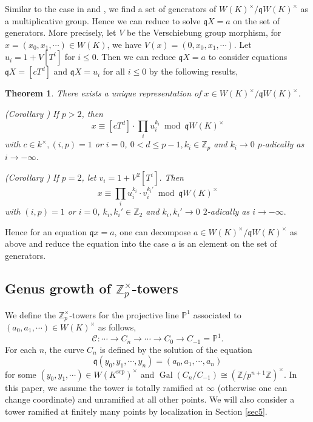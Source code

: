 \documentclass{proc-l}
\newtheorem{theorem}{Theorem}[section]
\theoremstyle{definition}
\theoremstyle{remark}
\numberwithin{equation}{section}
\DeclareMathOperator{\Gal}{Gal}
\DeclareMathOperator{\sep}{sep}
\begin{document}
{Similar to the case in \cite{MR3754335} and \cite{MR1697859}, we find a set of generators of $W(K)^\times/\mathfrak qW(K)^\times$ as a multiplicative group. Hence we can reduce to solve $\mathfrak qX=a$ on the set of generators. More precisely, let $V$ be the Verschiebung group morphism, for $x=(x_0,x_1,\cdots)\in W(K)$, we have $V(x)=(0,x_0,x_1,\cdots)$. Let $u_i=1+V[T^i]$ for $i\leq0$. Then we can reduce $\mathfrak qX=a$ to consider equations $\mathfrak qX=[cT^d]$ and $\mathfrak qX=u_i$ for all $i\leq0$ by the following results,
\begin{theorem}{\label {13}}
     There exists a unique representation of $x\in W(K)^\times/\mathfrak qW(K)^\times$. 
     
(Corollary \boxed{\ref{3.8}}) If $p>2$, then
$$x\equiv [cT^d]\cdot\prod_{i}u_i^{k_i}\bmod\mathfrak qW(K)^\times$$
with $c\in k^\times, (i,p)=1$ or $i=0$, $0< d\leq p-1,k_i\in\mathbb Z_p$ and $k_i\rightarrow 0$ $p$-adically as $i\rightarrow-\infty$.

(Corollary \boxed{\ref{3.7}}) If $p=2$, let $v_i=1+V^2[T^i]$. Then 
$$x\equiv\prod_{i}u_i^{k_i}\cdot v_i^{k_i'}\bmod\mathfrak qW(K)^\times$$
with $(i,p)=1$ or $i=0$, $k_i,k_i'\in\mathbb Z_2$ and $k_i,k_i'\rightarrow0$ $2$-adically as $i\rightarrow-\infty.$
\end{theorem} 

Hence for an equation $\mathfrak qx=a$, one can decompose $a\in W(K)^\times/\mathfrak qW(K)^\times$ as above and reduce the equation into the case $a$ is an element on the set of generators.


\subsection{Genus growth of $\mathbb Z_p^\times$-towers}
We define the $\mathbb Z_p^\times$-towers for the projective line $\mathbb P^1$ associated to $(a_0,a_1,\cdots)\in W(K)^\times$ as follows,
$$\mathscr C:\cdots\rightarrow C_n\rightarrow\cdots\rightarrow C_0\rightarrow C_{-1}=\mathbb P^1.$$
For each $n$, the curve $C_n$ is defined by the solution of the equation $$\mathfrak q(y_0,y_1,\cdots,y_{n})=(a_0,a_1,\cdots,a_{n})$$ for some $(y_0,y_1,\cdots)\in W(K^{\sep})^\times$ and $\Gal(C_n/C_{-1})\cong(\mathbb Z/p^{n+1}\mathbb Z)^\times$. In this paper, we assume the tower is totally ramified at $\infty$ (otherwise one can change coordinate) and unramified at all other points. We will also consider a tower ramified at finitely many points by localization in Section \ref{sec5}.

}
\end{document}
